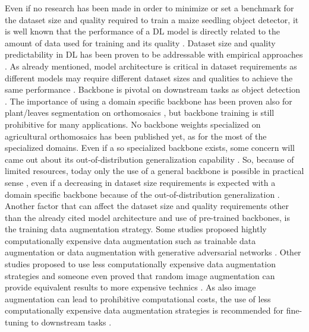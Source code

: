 \documentclass[12pt,a4paper,oneside]{report}
\begin{document}
Even if no research has been made in order to minimize or set a benchmark for the dataset size and quality
required to train a maize seedling object detector,
it is well known that the performance of a DL model is directly related to the
amount of data used for training \cite{sunRevisitingUnreasonableEffectiveness2017} and 
its quality \cite{alhazmiEffectsAnnotationQuality2021}.
Dataset size and quality predictability in DL has been proven to be
addressable with empirical approaches \cite{hestnessDeepLearningScaling2017,mahmoodHowMuchMore2022}.
As already mentioned, model architecture is critical in dataset requirements as different models may require
different dataset sizes and qualities to achieve the same performance \cite{nguyenEvaluationDeepLearning2020,brigatoCloseLookDeep2020}.
Backbone is pivotal on downstream tasks as object detection \cite{duSpineNetLearningScalePermuted2020}. 
The importance of using a domain specific backbone has been proven also
for plant/leaves segmentation on orthomosaics \cite{roggiolaniDomainSpecificPreTraining2023},
but backbone training is still prohibitive for many applications.
No backbone weights specialized on agricultural orthomosaics has been published yet,
as for the most of the specialized domains. Even if a so specialized backbone exists,
some concern will came out about its out-of-distribution generalization capability \cite{hendrycksManyFacesRobustness2020}.
So, because of limited resources, today only the use of a general backbone is 
possible in practical sense \cite{jeevanWhichBackboneUse2024},
even if a decreasing in dataset size requirements is expected with a domain specific 
backbone because of the out-of-distribution generalization \cite{goldblumBattleBackbonesLargeScale2023}.
Another factor that can affect the dataset size and quality requirements other than 
the already cited model architecture and use of pre-trained backbones, is the training data
augmentation strategy. Some studies proposed hightly computationally expensive data augmentation
such as trainable data augmentation \cite{cubukAutoAugmentLearningAugmentation2019} or
data augmentation with generative adversarial networks \cite{antoniouDataAugmentationGenerative2018}.
Other studies proposed to use less computationally expensive data augmentation strategies
\cite{shortenSurveyImageData2019,chadebecDataAugmentationVariational2021} and someone
even proved that random image augmentation can provide equivalent results to more
expensive technics \cite{mullerTrivialAugmentTuningfreeStateoftheArt2021}.
As also image augmentation can lead to prohibitive computational costs, the use of
less computationally expensive data augmentation strategies is recommended for
fine-tuning to downstream tasks \cite{shortenSurveyImageData2019}.
\end{document}
